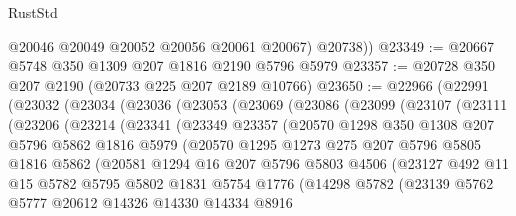 \begin{lexlean}{RustStd}
\begin{coremodule}
          @20046
          @20049
          @20052
          @20056
          @20061
          @20067)
        @20738))
@23349 := @20667 @5748 @350 @1309 @207 @1816 @2190 @5796 @5979
@23357 := @20728 @350 @207 @2190 (@20733 @225 @207 @2189 @10766)
@23650 := @22966
    (@22991
      (@23032
        (@23034
          (@23036
            (@23053
              (@23069
                (@23086
                  (@23099
                    (@23107
                      (@23111
                        (@23206
                          (@23214
                            (@23341
                              (@23349
                                @23357
                                (@20570
                                  @1298
                                  @350
                                  @1308
                                  @207
                                  @5796
                                  @5862
                                  @1816
                                  @5979
                                  (@20570
                                    @1295
                                    @1273
                                    @275
                                    @207
                                    @5796
                                    @5805
                                    @1816
                                    @5862
                                    (@20581
                                      @1294
                                      @16
                                      @207
                                      @5796
                                      @5803
                                      @4506
                                      (@23127
                                        @492
                                        @11
                                        @15
                                        @5782
                                        @5795
                                        @5802
                                        @1831
                                        @5754
                                        @1776
                                        (@14298
                                          @5782
                                          (@23139
                                            @5762
                                            @5777
                                            @20612
                                            @14326
                                            @14330
                                            @14334
                                            @8916

\end{coremodule}
\end{lexlean}
